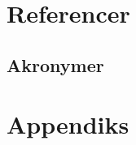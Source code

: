 \documentclass[a4paper,11pt,fleqn,twoside,openright]{memoir}
\begin{document}

\makeatletter\@openrightfalse
\let\cleardoublepage\clearpage
\part{Referencer}



\newpage
\listoffigures

\listoftables

\vspace*{18mm}
\begingroup
\let\clearpage\relax
\let\cleardoublepage\relax
\chapter*{Akronymer}
\AcroListtrue

\endgroup


\@openrighttrue\makeatother



\part{Appendiks}
\appendix
{}

%
%


%
%






\newpage
\printindex
\end{document}
